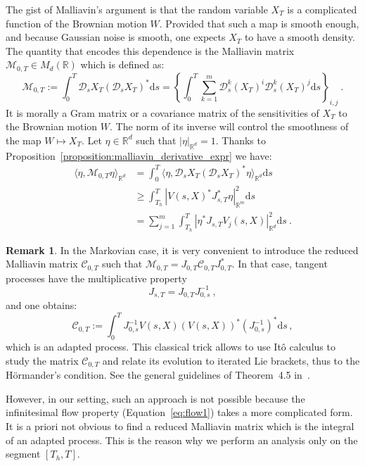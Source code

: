\documentclass[11pt]{article}
\theoremstyle{definition}
\newtheorem{rema}[theo]{Remark}
\newcommand{\Mc}{\mathcal{M}}
\numberwithin{equation}{section}
\numberwithin{figure}{section}
\numberwithin{table}{section}
\newcommand*\R{\mathbb{R}}
\newcommand*\Cc{\mathcal{C}}
\newcommand*\Dc{\mathcal{D}}
\newcommand{\Mcal}{\mathcal{M}}%
\newcommand*{\dd}{\mathrm{d}}
\newcommand*{\ds}{\dd s}
\begin{document}
The gist of Malliavin's argument is that the random variable $X_T$ is a complicated function of the Brownian motion $W$. Provided that such a map is smooth enough, and because Gaussian noise is smooth, one expects $X_T$ to have a smooth density. The quantity that encodes this dependence is the Malliavin matrix $\Mcal_{0,T} \in M_d(\R)$ which is defined as:
\begin{equation}\label{eq:malliavin_matrix}
\Mcal_{0,T}:=  \int_0^T \Dc_s X_T \left(\Dc_s X_T \right)^* \ds=\left\{ \int_0^T \sum_{k=1}^m \Dc_s^k \left(X_T\right)^i \Dc_s^k \left(X_T\right)^j \ds\right\}_{i,j}\ .
\end{equation}
It is morally a Gram matrix or a covariance matrix of the sensitivities of $X_T$ to the Brownian motion $W$. The norm of its inverse will control the smoothness of the map $W \mapsto X_T$. Let $\eta \in \R^d$ such that $\left| \eta \right|_{\R^d}=1$. Thanks to Proposition~\ref{proposition:malliavin_derivative_expr} we have:
\begin{align*}
\langle \eta, \Mcal_{0,T} \eta \rangle_{\R^d} &= \int_0^T \langle \eta, \Dc_s X_T \left(\Dc_s X_T \right)^* \eta \rangle_{\R^d} \ds\\
& \geq \int_{T_h}^T \left| V(s,X)^* J_{s,T}^* \eta \right|_{\R^m}^2 \ds\\
&= \sum_{j=1}^m \int_{T_h}^T \left| \eta^* J_{s,T} V_j(s,X) \right|_{\R^d}^2 \ds \ .
\end{align*}

\begin{rema}
In the Markovian case, it is very convenient to introduce the reduced Malliavin matrix $\Cc_{0,T}$ such that $\Mcal_{0,T} = J_{0,T} \Cc_{0,T} J_{0,T}^*$. In that case, tangent processes have the multiplicative property
\[
J_{s,T} = J_{0,T} J_{0,s}^{-1} \ ,
\]
and one obtains:
\begin{equation}\label{eq:malliavin_matrix_reduced}
\Cc_{0,T} :=  \int_0^T J_{0, s}^{-1} V\left(s, X\right)
\left(V\left(s,X\right) \right)^*
\left(J_{0, s}^{-1} \right)^* \ds \, ,
\end{equation}
which is an adapted process. This classical trick allows to use Itô calculus to study the matrix $\Cc_{0,T}$ and relate its evolution to iterated Lie brackets, thus to the H\"ormander's condition. See the general guidelines of Theorem~4.5 in~\cite{Hairer11}.

However, in our setting, such an approach is not possible because the infinitesimal flow property (Equation~\eqref{eq:flow1}) takes a more complicated form. It is a priori not obvious to find a reduced Malliavin matrix which is the integral of an adapted process. This is the reason why we perform an analysis only on the segment $[T_h, T]$.
\end{rema}
\end{document}
